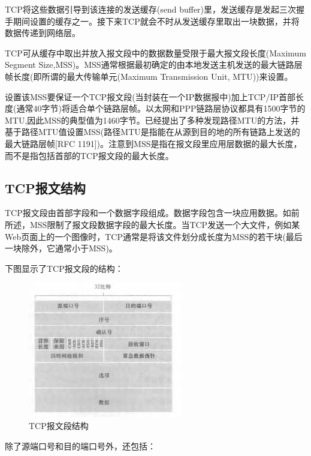     TCP将这些数据引导到该连接的发送缓存(send buffer)里，发送缓存是发起三次握手期间设置的缓存之一。接下来TCP就会不时从发送缓存里取出一块数据，并将数据传递到网络层。

    TCP可从缓存中取出并放入报文段中的数据数量受限于最大报文段长度(Maximum Segment Size,MSS)。MSS通常根据最初确定的由本地发送主机发送的最大链路层帧长度(即所谓的最大传输单元(Maximum Transmission Unit, MTU))来设置。

    设置该MSS要保证一个TCP报文段(当封装在一个IP数据报中)加上TCP/IP首部长度(通常40字节)将适合单个链路层帧。以太网和PPP链路层协议都具有1500字节的MTU,因此MSS的典型值为1460字节。已经提出了多种发现路径MTU的方法，并基于路径MTU值设置MSS(路径MTU是指能在从源到目的地的所有链路上发送的最大链路层帧[RFC 1191])。注意到MSS是指在报文段里应用层数据的最大长度，而不是指包括首部的TCP报文段的最大长度。

\subsection{TCP报文结构}

    TCP报文段由首部字段和一个数据字段组成。数据字段包含一块应用数据。如前所述，MSS限制了报文段数据字段的最大长度。当TCP发送一个大文件，例如某Web页面上的一个图像时，TCP通常是将该文件划分成长度为MSS的若干块(最后一块除外，它通常小于MSS)。

    下图显示了TCP报文段的结构：

\begin{figure}[!htbp]
    \centering
    \includegraphics[width=0.6\textwidth]{image/chapter03/TCP报文结构.png}
    \caption{TCP报文段结构}
\end{figure}

    除了源端口号和目的端口号外，还包括：

